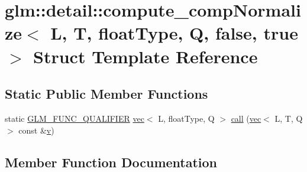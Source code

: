 \hypertarget{structglm_1_1detail_1_1compute__comp_normalize_3_01_l_00_01_t_00_01float_type_00_01_q_00_01false_00_01true_01_4}{}\section{glm\+:\+:detail\+:\+:compute\+\_\+comp\+Normalize$<$ L, T, float\+Type, Q, false, true $>$ Struct Template Reference}
\label{structglm_1_1detail_1_1compute__comp_normalize_3_01_l_00_01_t_00_01float_type_00_01_q_00_01false_00_01true_01_4}
\subsection*{Static Public Member Functions}
\begin{DoxyCompactItemize}
\item 
static \hyperlink{setup_8hpp_a33fdea6f91c5f834105f7415e2a64407}{G\+L\+M\+\_\+\+F\+U\+N\+C\+\_\+\+Q\+U\+A\+L\+I\+F\+I\+ER} \hyperlink{structglm_1_1vec}{vec}$<$ L, float\+Type, Q $>$ \hyperlink{structglm_1_1detail_1_1compute__comp_normalize_3_01_l_00_01_t_00_01float_type_00_01_q_00_01false_00_01true_01_4_ac4106152eca812bf0f16045bfccdb3d6}{call} (\hyperlink{structglm_1_1vec}{vec}$<$ L, T, Q $>$ const \&\hyperlink{_s_d_l__opengl_8h_a10a82eabcb59d2fcd74acee063775f90}{v})
\end{DoxyCompactItemize}


\subsection{Member Function Documentation}
\mbox{\label{structglm_1_1detail_1_1compute__comp_normalize_3_01_l_00_01_t_00_01float_type_00_01_q_00_01false_00_01true_01_4_ac4106152eca812bf0f16045bfccdb3d6}} 
